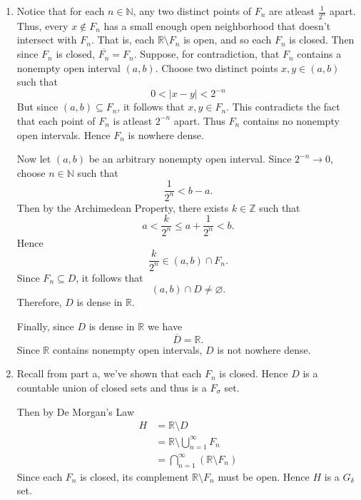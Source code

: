 \documentclass[12pt]{article}
\begin{document}
\begin{enumerate}[label=(\alph*)]
    \item
          Notice that for each \( n \in \mathbb{N} \), any two distinct points of \( F_n \) are atleast \( \frac{1}{2^n} \) apart. Thus, every \( x \not \in F_n \) has a small enough open neighborhood that doesn't intersect with \( F_n \). That is, each \( \mathbb{R} \setminus F_n \) is open, and so each \( F_n \) is closed. Then since \( F_n \) is closed, \( \overline{F_n } = F_n \). Suppose, for contradiction, that \( F_n \) contains a nonempty open interval \( (a,b) \). Choose two distinct points \( x,y \in (a,b) \) such that
          \[
              0 < \vert x - y \vert < 2^{-n}
          \]
          But since \( (a,b) \subseteq F_n\), it follows that \( x,y \in F_n. \) This contradicts the fact that each point of \( F_n \) is atleast \( 2^{-n} \) apart. Thus \( F_{n} \) contains no nonempty open intervals. Hence \( F_n \) is nowhere dense.

          Now let \( (a,b) \) be an arbitrary nonempty open interval.    Since \( 2^{-n} \to 0 \), choose \( n \in \mathbb{N} \) such that
          \[
              \frac{1}{2^n} < b - a.
          \]
          Then by the Archimedean Property, there exists \( k \in \mathbb{Z} \) such that
          \[
              a < \frac{k}{2^n} \leq a + \frac{1}{2^n} < b.
          \]
          Hence
          \[
              \frac{k}{2^n} \in (a,b) \cap F_n.
          \]
          Since \( F_n \subseteq D \), it follows that
          \[
              (a,b) \cap D \neq \varnothing .
          \]
          Therefore, \( D \) is dense in \( \mathbb{R} \).

          Finally, since \( D \) is dense in \( \mathbb{R} \) we have
          \[
              \overline{D} = \mathbb{R}.
          \]
          Since \( \mathbb{R} \) contains nonempty open intervals, \( D \) is not nowhere dense.


    \item
          Recall from part a, we've shown that each \( F_n \) is closed. Hence \( D \) is a countable union of closed sets and thus is a \( F_{\sigma } \) set.

          Then by De Morgan's Law
          \[
              \begin{split}
                  H & = \mathbb{R} \setminus D                             \\
                    & = \mathbb{R} \setminus \bigcup_{n=1}^{\infty} F_n    \\
                    & = \bigcap_{n=1}^{\infty} (\mathbb{R} \setminus  F_n)
              \end{split}
          \]
          Since each \( F_n  \) is closed, its complement \( \mathbb{R} \setminus F_n \) must be open. Hence \( H \) is a \( G_\delta  \) set.


\end{enumerate}
\end{document}
